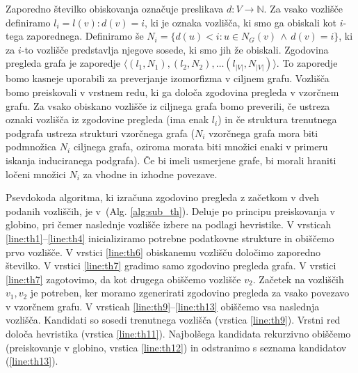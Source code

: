 \documentclass[a4paper, 12pt, ]{book}
\newcommand{\refalg}[1]{(Alg. \ref{#1})}
\begin{document}
	Zaporedno številko obiskovanja označuje preslikava $d : V \to \mathbb{N}$. Za vsako vozlišče definiramo $l_i = l(v): d(v) = i$, ki je oznaka vozlišča,
	ki smo ga obiskali kot $i$-tega zaporednega. Definiramo še $N_i = \{ d(u) < i: u \in N_G(v) \, \wedge \, d(v) = i\}$, ki za $i$-to vozlišče predstavlja
	njegove sosede, ki smo jih že obiskali. Zgodovina pregleda grafa je zaporedje $\langle (l_1, N_1), (l_2, N_2), \ldots (l_{|V|}, N_{|V|})\rangle$. To
	zaporedje bomo kasneje uporabili za preverjanje izomorfizma v ciljnem grafu. Vozlišča bomo preiskovali v vrstnem redu, ki ga določa zgodovina pregleda
	v vzorčnem grafu. Za vsako obiskano vozlišče iz ciljnega grafa bomo preverili, če ustreza oznaki vozlišča iz zgodovine pregleda (ima enak $l_i$) in če
	struktura trenutnega podgrafa ustreza strukturi vzorčnega grafa ($N_i$ vzorčnega grafa mora biti podmnožica $N_i$ ciljnega grafa, oziroma morata biti
	množici enaki v primeru iskanja induciranega podgrafa). Če bi imeli usmerjene grafe, bi morali hraniti ločeni množici $N_i$ za vhodne in izhodne
	povezave.
	
	Psevdokoda algoritma, ki izračuna zgodovino pregleda z začetkom v dveh podanih vozliščih, je v~\refalg{alg:sub_th}. Deluje po principu preiskovanja
	v globino, pri čemer naslednje vozlišče izbere na podlagi hevristike. V vrsticah \ref{line:th1}--\ref{line:th4} inicializiramo potrebne podatkovne strukture
	in obiščemo prvo vozlišče. V vrstici \ref{line:th6} obiskanemu vozlišču določimo zaporedno številko. V vrstici \ref{line:th7} gradimo samo zgodovino
	pregleda grafa. V vrstici \ref{line:th7} zagotovimo, da kot drugega obiščemo vozlišče $v_2$. Začetek na vozliščih $v_1, v_2$ je potreben, ker moramo 
	zgenerirati zgodovino pregleda za vsako povezavo v vzorčnem grafu. V vrsticah \ref{line:th9}--\ref{line:th13} obiščemo vsa naslednja vozlišča. Kandidati
	so sosedi trenutnega vozlišča (vrstica \ref{line:th9}). Vrstni red določa hevristika (vrstica \ref{line:th11}). Najbolšega kandidata rekurzivno obiščemo
	(preiskovanje v globino, vrstica \ref{line:th12}) in odstranimo s seznama kandidatov (\ref{line:th13}).
	
\end{document}
